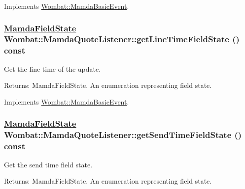 Implements \hyperlink{classWombat_1_1MamdaBasicEvent_a61a566e3442181ca1fadc4524296cd0}{Wombat::Mamda\-Basic\-Event}.\hypertarget{classWombat_1_1MamdaQuoteListener_35e889726482c3d6865c20adfd311e0b}{
\subsubsection[getLineTimeFieldState]{\setlength{\rightskip}{0pt plus 5cm}\hyperlink{namespaceWombat_93aac974f2ab713554fd12a1fa3b7d2a}{Mamda\-Field\-State} Wombat::Mamda\-Quote\-Listener::get\-Line\-Time\-Field\-State () const}}
\label{classWombat_1_1MamdaQuoteListener_35e889726482c3d6865c20adfd311e0b}


Get the line time of the update. 

\begin{Desc}
\item[Returns:]Mamda\-Field\-State. An enumeration representing field state. \end{Desc}


Implements \hyperlink{classWombat_1_1MamdaBasicEvent_eb06352aca3280c5e89bad7a3b185cdf}{Wombat::Mamda\-Basic\-Event}.\hypertarget{classWombat_1_1MamdaQuoteListener_751c64ca7bad56ffc99ca72e1494fb01}{
\subsubsection[getSendTimeFieldState]{\setlength{\rightskip}{0pt plus 5cm}\hyperlink{namespaceWombat_93aac974f2ab713554fd12a1fa3b7d2a}{Mamda\-Field\-State} Wombat::Mamda\-Quote\-Listener::get\-Send\-Time\-Field\-State () const}}
\label{classWombat_1_1MamdaQuoteListener_751c64ca7bad56ffc99ca72e1494fb01}


Get the send time field state. 

\begin{Desc}
\item[Returns:]Mamda\-Field\-State. An enumeration representing field state. \end{Desc}


